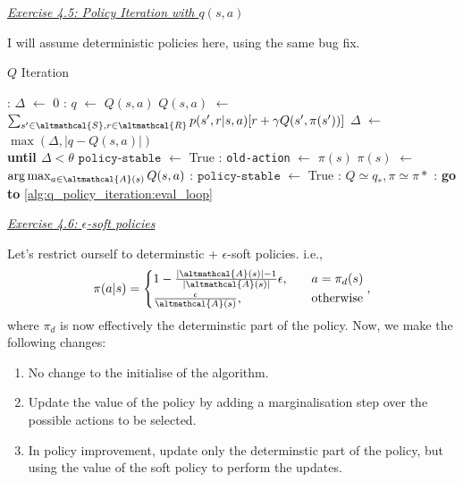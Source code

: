 \documentclass{article}
\newcommand{\myq}[1]{%
	\vspace{1em}
	\noindent\underline{\emph{Exercise #1}}\vspace{0.25em}\linebreak
}
\newcommand*\Let[2]{\State #1 $\gets$ #2}
\begin{document}
\myq{4.5: Policy Iteration with $q(s, a)$}
I will assume deterministic policies here, using the same bug fix. 
\begin{algorithm}[H]
	\caption{$Q$ Iteration
		\label{alg:q_policy_eval}}
	\begin{algorithmic}[1]
		\Statex
		\Loop:  \label{alg:q_policy_iteration:eval_loop}
		\Let{$\Delta$}{0}
		: 
		\Let{$q$}{$Q(s, a)$}
		\Let{$Q(s, a)$}{$\sum_{s' \in \altmathcal{S}, r \in \altmathcal{R}} p(s', r | s, a)[r + \gamma Q(s', \pi(s'))]$}
		\Let{$\Delta$}{$\max(\Delta, |q - Q(s, a)|)$}
		\EndFor
		\EndFor
		\EndLoop\\\textbf{until $\Delta < \theta$}
		\Statex
		\Let{$\texttt{policy-stable}$}{True} 
		: 
		\Let{\texttt{old-action}}{$\pi(s)$}
		\Let{$\pi(s)$}{$\arg \max_{a \in \altmathcal{A}(s)} Q(s, a)$} 
		: 
		\Let{$\texttt{policy-stable}$}{True}
		\EndIf
		\EndFor
		:
		\State \Return $Q \simeq q_*, \pi 
		\simeq \pi* $
		\Else: \State \textbf{ go to} \ref{alg:q_policy_iteration:eval_loop}
		\EndIf
	\end{algorithmic}
\end{algorithm}

\myq{4.6: $\epsilon$-soft policies}
Let's restrict ourself to determinstic + $\epsilon$-soft policies. i.e.,
\begin{align}
\pi(a | s) = \begin{cases}
1 - \frac{|\altmathcal{A}(s)| - 1 }{|\altmathcal{A}(s)|}\epsilon, \quad &a = \pi_d(s) \\
\frac{\epsilon}{\altmathcal{A}(s)}, &\text{otherwise}
\end{cases},
\end{align}
where $\pi_d$ is now effectively the determinstic part of the policy. Now, we make the following changes:
\begin{enumerate}[noitemsep]
	\item No change to the initialise of the algorithm. 
	\item Update the value of the policy by adding a marginalisation step over the possible actions to be selected. 
	\item In policy improvement, update only the determinstic part of the policy, but using the value of the soft policy to perform the updates. 
\end{enumerate}
\end{document}
